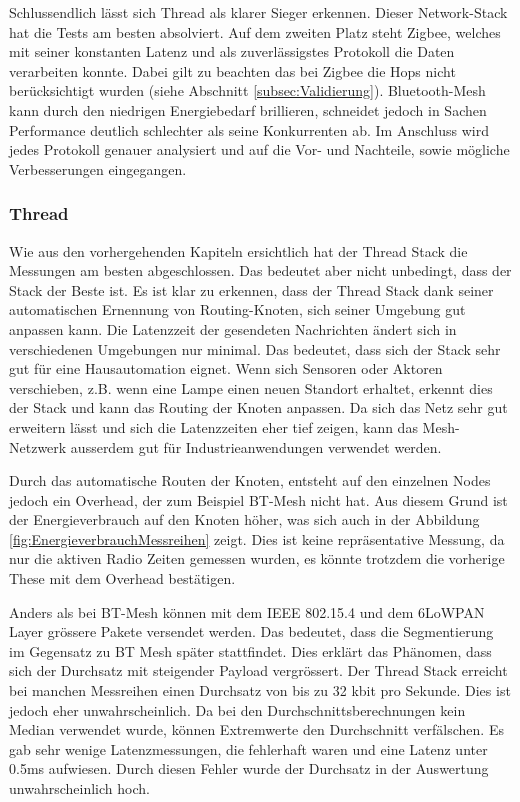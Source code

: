 Schlussendlich lässt sich Thread als klarer Sieger erkennen. Dieser Network-Stack hat die Tests am besten absolviert. Auf dem zweiten Platz steht Zigbee, welches mit seiner konstanten Latenz und als zuverlässigstes Protokoll die Daten verarbeiten konnte. Dabei gilt zu beachten das bei Zigbee die Hops nicht berücksichtigt wurden (siehe Abschnitt \ref{subsec:Validierung}). Bluetooth-Mesh kann durch den niedrigen Energiebedarf brillieren, schneidet jedoch in Sachen Performance deutlich schlechter als seine Konkurrenten ab. Im Anschluss wird jedes Protokoll genauer analysiert und auf die Vor- und Nachteile, sowie mögliche Verbesserungen eingegangen. 


\subsubsection{Thread}\label{subsubsec:FazitThread}
Wie aus den vorhergehenden Kapiteln ersichtlich hat der Thread Stack die Messungen am besten abgeschlossen. Das bedeutet aber nicht unbedingt, dass der Stack der Beste ist. Es ist klar zu erkennen, dass der Thread Stack dank seiner automatischen Ernennung von Routing-Knoten, sich seiner Umgebung gut anpassen kann. Die Latenzzeit der gesendeten Nachrichten ändert sich in verschiedenen Umgebungen nur minimal. Das bedeutet, dass sich der Stack sehr gut für eine Hausautomation eignet. Wenn sich Sensoren oder Aktoren verschieben, z.B. wenn eine Lampe einen neuen Standort erhaltet, erkennt dies der Stack und kann das Routing der Knoten anpassen. Da sich das Netz sehr gut erweitern lässt und sich die Latenzzeiten eher tief zeigen, kann das Mesh-Netzwerk ausserdem gut für Industrieanwendungen verwendet werden. 

Durch das automatische Routen der Knoten, entsteht auf den einzelnen Nodes jedoch ein Overhead, der zum Beispiel BT-Mesh nicht hat. Aus diesem Grund ist der Energieverbrauch auf den Knoten höher, was sich auch in der Abbildung \ref{fig:EnergieverbrauchMessreihen} zeigt. Dies ist keine repräsentative Messung, da nur die aktiven Radio Zeiten gemessen wurden, es könnte trotzdem die vorherige These mit dem Overhead bestätigen. 

Anders als bei BT-Mesh können mit dem IEEE 802.15.4 und dem 6LoWPAN Layer grössere Pakete versendet werden. Das bedeutet, dass die Segmentierung im Gegensatz zu BT Mesh später stattfindet. Dies erklärt das Phänomen, dass sich der Durchsatz mit steigender Payload vergrössert. Der Thread Stack erreicht bei manchen Messreihen einen Durchsatz von bis zu 32 kbit pro Sekunde. Dies ist jedoch eher unwahrscheinlich. Da bei den Durchschnittsberechnungen kein Median verwendet wurde, können Extremwerte den Durchschnitt verfälschen. Es gab sehr wenige Latenzmessungen, die fehlerhaft waren und eine Latenz unter 0.5ms aufwiesen. Durch diesen Fehler wurde der Durchsatz in der Auswertung unwahrscheinlich hoch. 

